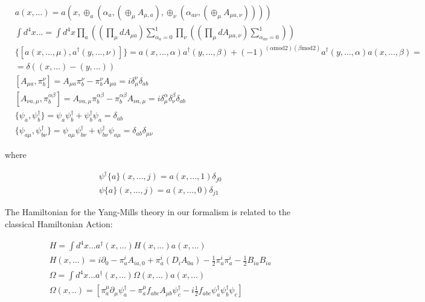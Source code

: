 \documentclass[11pt]{book}
\begin{document}
\begin{equation}\begin{aligned}
    & a(x, ...) = a(x,\oplus_{a} (\alpha_{a},(\oplus_{\mu}A_{\mu,a}),\oplus_{\nu}(\alpha_{a \nu},(\oplus_{\mu}A_{\mu a,\nu}))))\\
    & \int d^4 x ... = \int d^4 x \prod_{a}((\prod_{\mu}dA_{\mu a})\sum_{\alpha_{a}=0}^1\prod_{\nu}((\prod_{\mu}d A_{\mu a,\nu})\sum_{\alpha_{a \nu}=0}^1)) \\
 &\{[a(x, ..., \mu),a^\dagger(y, ...,\nu)]\}=a(x, ...,\alpha) a^\dagger(y, ...,\beta)+(-1)^{(\alpha \mathrm{mod} 2)(\beta \mathrm{mod} 2)}a^\dagger(y, ...,\alpha) a(x, ...,\beta)=\\
&=\delta((x,...)-(y,...))\\
    &[A_{\mu a},\pi^{\nu}_{b}]=A_{\mu a}\pi^{\nu}_{b}-\pi^{\nu}_{b} A_{\mu a}= i\delta^{\nu}_{\mu} \delta_{a b}\\
    &[ A_{\nu a,\mu},\pi^{\alpha\beta}_{b}]=A_{\nu a,\mu}\pi^{\alpha \beta}_{b}-\pi^{\alpha\beta}_{b} A_{\nu a,\mu}= i\delta^{\alpha}_{\mu}\delta^{\beta}_{\nu}\delta_{a b}\\
 &\{\psi_{a},\psi^\dagger_{b}\}=\psi_{a} \psi^\dagger_{b}+\psi^\dagger_{b}\psi_{a}=\delta_{a b}\\
&\{\psi_{a \mu},\psi^\dagger_{b \nu}\}=\psi_{a \mu} \psi^\dagger_{b \nu}+\psi^\dagger_{b \nu}\psi_{a \mu}=\delta_{a b}\delta_{\mu \nu}
\end{aligned}\end{equation}

where

\begin{equation}\begin{aligned}
 & \psi^\dagger\{a\}(x, ...,j)= a(x, ...,1) \delta_{j 0}\\
& \psi\{a\}(x, ...,j)=  a(x, ...,0) \delta_{j 1}
\end{aligned}\end{equation}

The Hamiltonian for the Yang-Mills theory in our formalism is related to
the classical Hamiltonian
Action\cite{Mukhanov1995On}:

\begin{equation}\begin{aligned}
    &H=\int d^4 x ... a^\dagger(x, ...)H(x, ...) a(x, ...)\\
&H(x, ...)=i\partial_0-\pi^i_a A_{i a, 0}+ \pi^i_a (D_i A_{0 a})-\frac{1}{2}\pi^i_a\pi^i_a
    -\frac{1}{2} B_{i a} B_{i a}\\
    &\Omega=\int d^4 x ...  a^\dagger(x, ...) \Omega(x,...) a(x, ...)\\
    &\Omega(x,..)=\left[ \pi^{\mu}_{a} \partial_{\mu} \psi^\dagger_{a}-\pi^{\mu}_{a} f_{a b c} A_{\mu b} \psi^\dagger_{c} -i \frac{1}{2}f_{a b c} \psi^\dagger_{a} \psi^\dagger_{b} \psi_{c}\right]
\end{aligned}\end{equation}
\end{document}
